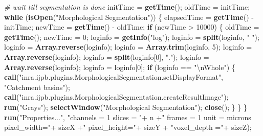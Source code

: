 \documentclass[11pt,singlespacinge,twoside]{reedthesis} %
\newenvironment{Shaded}{}{}
\newcommand{\CharTok}[1]{#1}
\newcommand{\CommentTok}[1]{\textit{#1}}
\newcommand{\ControlFlowTok}[1]{\textbf{#1}}
\newcommand{\DecValTok}[1]{#1}
\newcommand{\KeywordTok}[1]{\textbf{#1}}
\newcommand{\NormalTok}[1]{#1}
\newcommand{\OperatorTok}[1]{#1}
\newcommand{\StringTok}[1]{#1}
\theoremstyle{definition}
\theoremstyle{definition}
\theoremstyle{definition}
\theoremstyle{remark}
\begin{document}
\begin{Shaded}
\begin{Highlighting}[numbers=left,,]
\CommentTok{# wait till segmentation is done}
\NormalTok{    initTime =}\StringTok{ }\KeywordTok{getTime}\NormalTok{(); }
\NormalTok{  oldTime =}\StringTok{ }\NormalTok{initTime; }
    \ControlFlowTok{while}\NormalTok{ (}\KeywordTok{isOpen}\NormalTok{(}\StringTok{"Morphological Segmentation"}\NormalTok{)) \{}
\NormalTok{      elapsedTime =}\StringTok{ }\KeywordTok{getTime}\NormalTok{() }\OperatorTok{-}\StringTok{ }\NormalTok{initTime; }
\NormalTok{        newTime =}\StringTok{ }\KeywordTok{getTime}\NormalTok{() }\OperatorTok{-}\StringTok{ }\NormalTok{oldTime;}
        \ControlFlowTok{if}\NormalTok{ (newTime }\OperatorTok{>}\StringTok{ }\DecValTok{10000}\NormalTok{) \{}
\NormalTok{        oldTime =}\StringTok{ }\KeywordTok{getTime}\NormalTok{(); }
\NormalTok{        newTime =}\StringTok{ }\DecValTok{0}\NormalTok{;}
\NormalTok{        loginfo =}\StringTok{ }\KeywordTok{getInfo}\NormalTok{(}\StringTok{"log"}\NormalTok{);}
\NormalTok{            loginfo =}\StringTok{ }\KeywordTok{split}\NormalTok{(loginfo, }\StringTok{" "}\NormalTok{);}
\NormalTok{            loginfo =}\StringTok{ }\KeywordTok{Array.reverse}\NormalTok{(loginfo);}
\NormalTok{            loginfo =}\StringTok{ }\KeywordTok{Array.trim}\NormalTok{(loginfo, }\DecValTok{5}\NormalTok{);}
\NormalTok{            loginfo =}\StringTok{ }\KeywordTok{Array.reverse}\NormalTok{(loginfo);}
\NormalTok{            loginfo =}\StringTok{ }\KeywordTok{split}\NormalTok{(loginfo[}\DecValTok{0}\NormalTok{], }\StringTok{"."}\NormalTok{);}
\NormalTok{            loginfo =}\StringTok{ }\KeywordTok{Array.reverse}\NormalTok{(loginfo);}
\NormalTok{            loginfo =}\StringTok{ }\NormalTok{loginfo[}\DecValTok{0}\NormalTok{];}
            \ControlFlowTok{if}\NormalTok{ (loginfo }\OperatorTok{==}\StringTok{ "}\CharTok{\textbackslash{}n}\StringTok{Whole"}\NormalTok{) \{}
                \KeywordTok{call}\NormalTok{(}\StringTok{"inra.ijpb.plugins.MorphologicalSegmentation.setDisplayFormat"}\NormalTok{, }\StringTok{"Catchment basins"}\NormalTok{);}
                \KeywordTok{call}\NormalTok{(}\StringTok{"inra.ijpb.plugins.MorphologicalSegmentation.createResultImage"}\NormalTok{);}
                \KeywordTok{run}\NormalTok{(}\StringTok{"Grays"}\NormalTok{);}
                \KeywordTok{selectWindow}\NormalTok{(}\StringTok{"Morphological Segmentation"}\NormalTok{);}
                \KeywordTok{close}\NormalTok{();}
\NormalTok{            \}}
\NormalTok{    \}}
\NormalTok{    \}}
  \KeywordTok{run}\NormalTok{(}\StringTok{"Properties..."}\NormalTok{, }\StringTok{"channels = 1 slices = "}\OperatorTok{+}\StringTok{ }\NormalTok{n }\OperatorTok{+}\StringTok{" frames = 1 unit = microns pixel_width="}\OperatorTok{+}\StringTok{ }
\StringTok{        }\NormalTok{sizeX }\OperatorTok{+}\StringTok{" pixel_height="}\OperatorTok{+}\StringTok{ }\NormalTok{sizeY }\OperatorTok{+}\StringTok{ "voxel_depth ="}\OperatorTok{+}\StringTok{ }\NormalTok{sizeZ);}
\end{Highlighting}
\end{Shaded}
\normalsize
\end{document}
